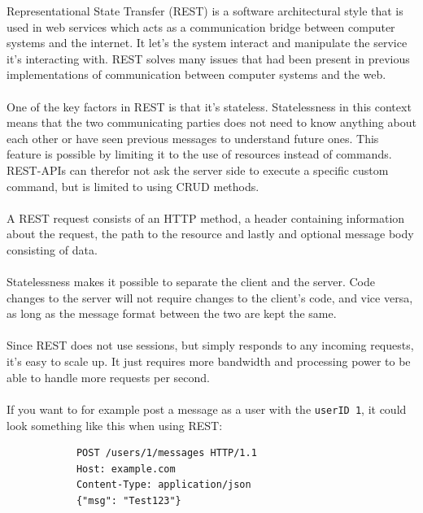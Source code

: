 \documentclass{cslthse-msc}
\begin{document}
    Representational State Transfer (REST) is a software architectural style
    that is used in web services which acts as a communication bridge
    between computer systems and the internet. It let's the system interact
    and manipulate the service it's interacting with. REST solves many
    issues that had been present in previous implementations of
    communication between computer systems and the web\citep{rest1, rest2}.
    \\ \\
    One of the key factors in REST is that it's stateless. Statelessness in
    this context means that the two communicating parties does not need to
    know anything about each other or have seen previous messages to
    understand future ones. This feature is possible by limiting it to the
    use of resources instead of commands. REST-APIs can therefor not ask the
    server side to execute a specific custom command, but is limited to
    using CRUD methods.
    \\ \\
    A REST request consists of an HTTP method, a header containing
    information about the request, the path to the resource and lastly and
    optional message body consisting of data.
    \\ \\
    Statelessness makes it possible to separate the client and the server.
    Code changes to the server will not require changes to the client's
    code, and vice versa, as long as the message format between the two are
    kept the same.
    \\ \\
    Since REST does not use sessions, but simply responds to any incoming
    requests, it's easy to scale up. It just requires more bandwidth and
    processing power to be able to handle more requests per second.
    \\ \\
    If you want to for example post a message as a user with the \texttt{userID 1}, it
    could look something like this when using REST:

    \begin{center}
        \lstset{%
        caption=An example of how an API call can look using REST,
        basicstyle=\ttfamily\footnotesize\bfseries,
        frame=tb
        }
        \begin{lstlisting}
            POST /users/1/messages HTTP/1.1
            Host: example.com
            Content-Type: application/json
            {"msg": "Test123"}
        \end{lstlisting}
    \end{center}
\end{document}
